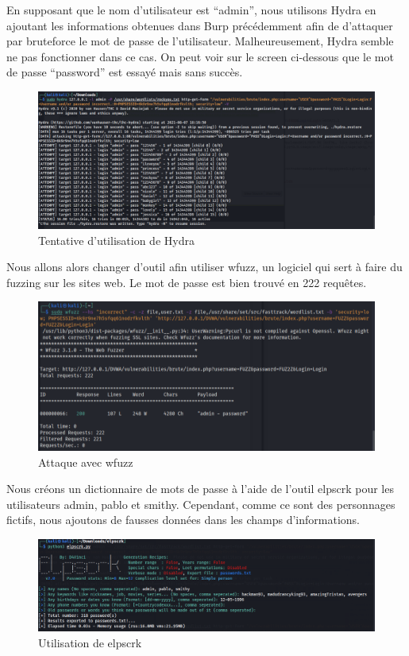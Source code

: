 \documentclass[12pt, oneside]{article}
\begin{document}
En supposant que le nom d’utilisateur est “admin”, nous utilisons Hydra en ajoutant les informations obtenues dans Burp précédemment afin de d'attaquer par bruteforce le mot de passe de l'utilisateur. Malheureusement, Hydra semble ne pas fonctionner dans ce cas. On peut voir sur le screen ci-dessous que le mot de passe “password” est  essayé mais sans succès.
\begin{figure}[H]
\centering
\includegraphics[scale=0.4]{Image9}
\caption{Tentative d'utilisation de Hydra}
\end{figure}
Nous allons alors changer d’outil afin utiliser wfuzz, un logiciel qui sert à faire du fuzzing sur les sites web. Le mot de passe est bien trouvé en 222 requêtes.
\begin{figure}[H]
\centering
\includegraphics[scale=0.4]{Image10}
\caption{Attaque avec wfuzz}
\end{figure}
Nous créons un dictionnaire de mots de passe à l’aide de l’outil elpscrk pour les utilisateurs admin, pablo et smithy. Cependant, comme ce sont des personnages fictifs, nous ajoutons de fausses données dans les champs d’informations.
\begin{figure}[H]
\centering
\includegraphics[scale=0.4]{Image11}
\caption{Utilisation de elpscrk}
\end{figure}
\end{document}
